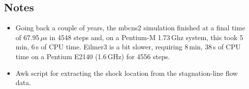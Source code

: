 \noindent
\topbar

\bottombar

\noindent
\topbar

\bottombar

\newpage
\subsection{Notes}
\begin{itemize}
\item Going back a couple of years, the mbcns2 simulation finished at 
      a final time of 67.95\,$\mu$s in 4548 steps and,
      on a Pentium-M 1.73\,Ghz system, this took 5\,min, 6\,s of CPU time.
      Eilmer3 is a bit slower, requiring 8\,min, 38\,s of CPU time
      on a Pentium E2140 (1.6\,GHz) for 4556 steps.
\item Awk script for extracting the shock location from the stagnation-line
      flow data.
      
\end{itemize}
